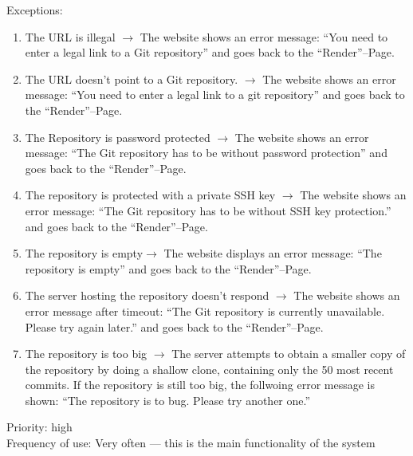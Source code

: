 \documentclass[11pt]{scrartcl}
\begin{document}
Exceptions:
\begin{enumerate}
\item The URL is illegal $\rightarrow$ The website shows an error message:
	\enquote{You need to enter a legal link to a Git repository} and goes
	back to the \enquote{Render}--Page.
\item The URL doesn't point to a Git repository. $\rightarrow$  The website
	shows an error message: \enquote{You need to enter a legal link to a git
	repository} and goes back to the \enquote{Render}--Page.
\item The Repository is password protected $\rightarrow$ The website shows an
	error message: \enquote{The Git repository has to be without password
	protection} and goes back to the \enquote{Render}--Page.
\item The repository is protected with a private SSH key $\rightarrow$ The
	website shows an error message: \enquote{The Git repository has to be
	without SSH key protection.} and goes back to the
	\enquote{Render}--Page.
\item The repository is empty$\rightarrow$ The website displays an error
	message: \enquote{The repository is empty} and goes back to the
	\enquote{Render}--Page.
\item The server hosting the repository doesn't respond $\rightarrow$ The
	website shows an error message after timeout: \enquote{The Git
	repository is currently unavailable. Please try again later.} and goes
	back to the \enquote{Render}--Page. 
\item The repository is too big $\rightarrow$  The server attempts to obtain a
	smaller copy of the repository by doing a shallow clone, containing only
	the 50 most recent commits. If the repository is still too big, the
	follwoing error message is shown: \enquote{The repository is to bug. Please try another one.}
\end{enumerate}

Priority: high \\
Frequency of use: Very often --- this is the main functionality of the system\\
\end{document}
